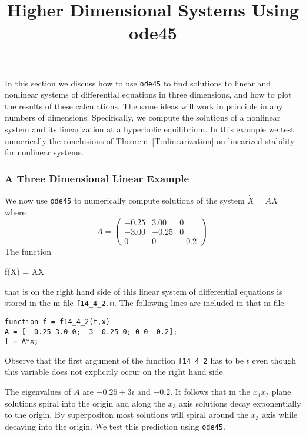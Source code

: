 \documentclass{ximera}
\title{Higher Dimensional Systems Using ode45}
\begin{document}
\begin{abstract}
\end{abstract}
\maketitle

\label{S:ode45HD}

In this section we discuss how to use {\tt ode45} to find solutions to linear
and nonlinear systems of differential equations in three dimensions, and how 
to plot the results of these calculations.  The same ideas will work in 
principle in any numbers of dimensions.  Specifically, we compute the solutions 
of a nonlinear system and its linearization at a hyperbolic equilibrium.  In 
this example we test numerically the conclusions of 
Theorem~\ref{T:nlinearization} on linearized stability for nonlinear systems.

 
\subsubsection*{A Three Dimensional Linear Example}

We now use {\tt ode45} to numerically compute solutions of the system
$\dot{X} = AX$ where 
\begin{equation}  \label{E:3dexample}
A = \left(\begin{array}{rrr}
  -0.25 & 3.00 & 0\\
   -3.00 & -0.25 &  0\\
   0 &  0 & -0.2
\end{array}\right).
\end{equation}
The function  
\begin{matlabEquation}\label{MATLAB:54}
f(X) = AX
\end{matlabEquation}
that is on the right hand side of this linear system of differential 
equations is stored in the m-file {\tt f14\_4\_2.m}.  The following lines 
are included in that m-file.
\begin{verbatim}
function f = f14_4_2(t,x)
A = [ -0.25 3.0 0; -3 -0.25 0; 0 0 -0.2];
f = A*x;
\end{verbatim}
Observe that the first argument of the function {\tt f14\_4\_2} has to be 
$t$ even though this variable does not explicitly occur on the right hand 
side.  

The eigenvalues of $A$ are $-0.25\pm 3i$ and $-0.2$.  It follows that in the 
$x_1x_2$ plane solutions spiral into the origin and along the $x_3$ axis 
solutions decay exponentially to the origin.  By superpositon most solutions
will spiral around the $x_3$ axis while decaying into the origin.  We test 
this prediction using {\tt ode45}.
\end{document}
